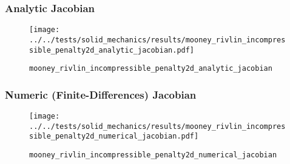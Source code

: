 
\begin{frame}
  \frametitle{Analytic Jacobian}
  \begin{figure}[h!]
    \centering    
    \texttt{[image: ../../tests/solid\_mechanics/results/mooney\_rivlin\_incompressible\_penalty2d\_analytic\_jacobian.pdf]}
    \caption{\lstinline{mooney_rivlin_incompressible_penalty2d_analytic_jacobian}}
  \end{figure} 
\end{frame}
%
%
\begin{frame}
  \frametitle{Numeric (Finite-Differences) Jacobian}
  \begin{figure}[h!]
    \centering    
    \texttt{[image: ../../tests/solid\_mechanics/results/mooney\_rivlin\_incompressible\_penalty2d\_numerical\_jacobian.pdf]}
    \caption{\lstinline{mooney_rivlin_incompressible_penalty2d_numerical_jacobian}}
  \end{figure}
\end{frame}
%
%
